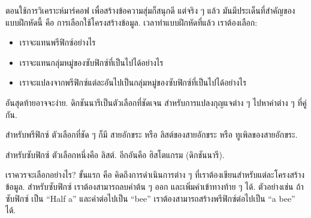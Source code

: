 ตอนใช้การวิเคราะห์มาร์คอฟ เพื่อสร้างข้อความสุ่มก็สนุกดี
แต่จริง ๆ แล้ว มันมีประเด็นที่สำคัญของแบบฝึกหัดนี้ คือ การเลือกใช้โครงสร้างข้อมูล.
เวลาทำแบบฝึกหัดที่แล้ว เราต้องเลือก:

\begin{itemize}


\item เราจะแทนพรีฟิกซ์อย่างไร


\item เราจะแทนกลุ่มหมู่ของซับฟิกซ์ที่เป็นไปได้อย่างไร


\item เราจะแปลงจากพรีฟิกซ์แต่ละอันไปเป็นกลุ่มหมู่ของซับฟิกซ์ที่เป็นไปได้อย่างไร

\end{itemize}


อันสุดท้ายอาจจะง่าย.
ดิกชันนารีเป็นตัวเลือกที่ชัดเจน สำหรับการแปลงกุญแจต่าง ๆ ไปหาค่าต่าง ๆ ที่คู่กัน.


สำหรับพรีฟิกซ์ ตัวเลือกที่ชัด ๆ ก็มี สายอักขระ หรือ ลิสต์ของสายอักขระ หรือ ทูเพิลของสายอักขระ.


สำหรับซับฟิกซ์
ตัวเลือกหนึ่งคือ ลิสต์.
อีกอันคือ ฮิสโตแกรม (ดิกชันนารี).


เราควรจะเลือกอย่างไร?
ขั้นแรก คือ คิดถึงการดำเนินการต่าง ๆ ที่เราต้องเขียนสำหรับแต่ละโครงสร้างข้อมูล.
สำหรับซับฟิกซ์ เราต้องสามารถลบคำต้น ๆ ออก และเพิ่มคำเข้าทางท้าย ๆ ได้.
ตัวอย่างเช่น ถ้าซับฟิกซ์ เป็น ``Half a'' และคำต่อไปเป็น ``bee''
เราต้องสามารถสร้างพรีฟิกซ์ต่อไปเป็น ``a bee'' ได้.


